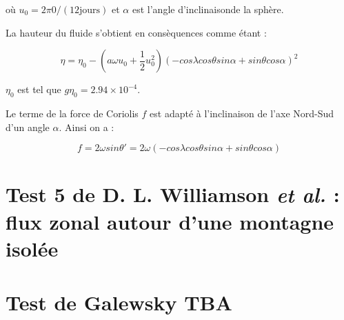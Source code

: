 où $u_0 = 2 \pi 0 / (12 \text{jours} )$ et $\alpha$ est l'angle d'inclinaisonde  la sphère.

La hauteur du fluide s'obtient en consèquences comme étant :

\begin{equation}
\eta = \eta_0 - \left( a \omega u_0 + \dfrac{1}{2}u_0^2 \right) \left( -cos \lambda cos \theta sin \alpha + sin \theta cos \alpha \right)^2
\end{equation}

$\eta_0$ est tel que $g \eta_0 = 2.94 \times 10^{-4}$. 

Le terme de la force de Coriolis $f$ est adapté à l'inclinaison de l'axe Nord-Sud d'un angle $\alpha$. Ainsi on a :

$$ f = 2 \omega sin \theta' = 2 \omega \left( -cos \lambda cos \theta sin \alpha + sin \theta cos \alpha \right)$$





\section{Test 5 de D. L. Williamson \textit{et al.} : flux zonal autour d'une montagne isolée}

\section{Test de Galewsky TBA}
